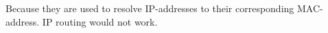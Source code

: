 Because they are used to resolve IP-addresses to their corresponding MAC-address.
IP routing would not work.